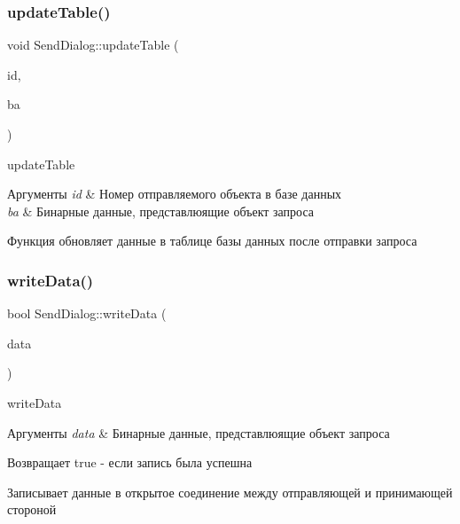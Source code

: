 \subsubsection{\texorpdfstring{update\+Table()}{updateTable()}}
{\footnotesize\ttfamily void Send\+Dialog\+::update\+Table (\begin{DoxyParamCaption}\item[{const int \&}]{id,  }\item[{Q\+Byte\+Array \&}]{ba }\end{DoxyParamCaption})\hspace{0.3cm}{\ttfamily [private]}}



update\+Table 


\begin{DoxyParams}{Аргументы}
{\em id} & Номер отправляемого объекта в базе данных \\
\hline
{\em ba} & Бинарные данные, представлюящие объект запроса\\
\hline
\end{DoxyParams}
Функция обновляет данные в таблице базы данных после отправки запроса \mbox{\label{classSendDialog_a2942d10e361268fb72c55fa158c57a83}} 
\subsubsection{\texorpdfstring{write\+Data()}{writeData()}}
{\footnotesize\ttfamily bool Send\+Dialog\+::write\+Data (\begin{DoxyParamCaption}\item[{const Q\+Byte\+Array \&}]{data }\end{DoxyParamCaption})\hspace{0.3cm}{\ttfamily [private]}}



write\+Data 


\begin{DoxyParams}{Аргументы}
{\em data} & Бинарные данные, представлюящие объект запроса \\
\hline
\end{DoxyParams}
\begin{DoxyReturn}{Возвращает}
true -\/ если запись была успешна
\end{DoxyReturn}
Записывает данные в открытое соединение между отправляющей и принимающей стороной 

